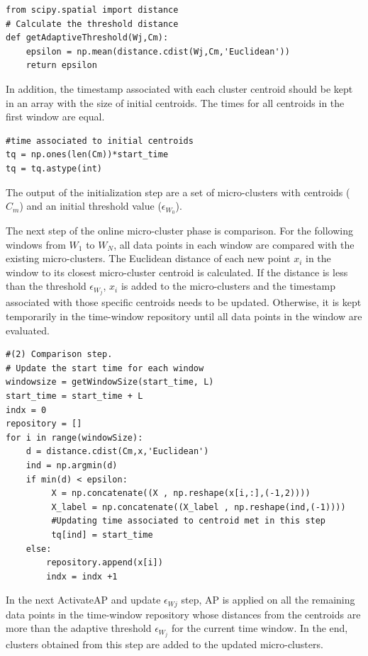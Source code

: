 \begin{lstlisting}
from scipy.spatial import distance
# Calculate the threshold distance
def getAdaptiveThreshold(Wj,Cm):
    epsilon = np.mean(distance.cdist(Wj,Cm,'Euclidean'))
    return epsilon 
\end{lstlisting}

In addition, the timestamp associated with each cluster centroid should be kept in an array with the size of initial centroids. The times for all centroids in the first window are equal.

\begin{lstlisting}
#time associated to initial centroids
tq = np.ones(len(Cm))*start_time
tq = tq.astype(int)
\end{lstlisting}


The output of the initialization step are a set of micro-clusters with centroids ($C_m$) and an initial threshold value ($\epsilon_{W_0}$).

The next step of the online micro-cluster phase is comparison. For the following windows from $W_1$ to $W_N$, all data points in each window are compared with the existing micro-clusters. The Euclidean distance of each new point $x_i$ in the window to its closest micro-cluster centroid is calculated. If the distance is less than the threshold $\epsilon_{W_j}$, $x_i$ is added to the micro-clusters and the timestamp associated with those specific centroids needs to be updated. Otherwise, it is kept temporarily in the time-window repository until all data points in the window are evaluated. 

\begin{lstlisting}
#(2) Comparison step.
# Update the start time for each window
windowsize = getWindowSize(start_time, L)
start_time = start_time + L
indx = 0
repository = []
for i in range(windowSize):
    d = distance.cdist(Cm,x,'Euclidean')
    ind = np.argmin(d)    
    if min(d) < epsilon:
         X = np.concatenate((X , np.reshape(x[i,:],(-1,2))))
         X_label = np.concatenate((X_label , np.reshape(ind,(-1))))
         #Updating time associated to centroid met in this step
         tq[ind] = start_time
    else:
        repository.append(x[i])       
        indx = indx +1
\end{lstlisting}


In the next ActivateAP and update $\epsilon_{Wj}$ step, AP is applied on all the remaining data points in the time-window repository whose distances from the centroids are more than the adaptive threshold $\epsilon_{W_j}$ for the current time window. In the end, clusters obtained from this step are added to the updated micro-clusters.  


